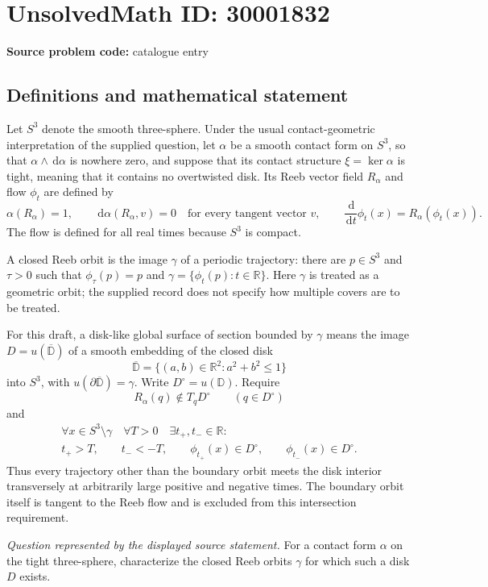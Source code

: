 \documentclass[11pt]{article}
\newcommand{\R}{\mathbb{R}}
\newcommand{\dd}{\,\mathrm{d}}
\begin{document}
\section*{UnsolvedMath ID: 30001832}
\textbf{Source problem code:} catalogue entry
\subsection{Definitions and mathematical statement}
Let \(S^3\) denote the smooth three-sphere. Under the usual contact-geometric interpretation of the supplied question, let \(\alpha\) be a smooth contact form on \(S^3\), so that \(\alpha\wedge\dd\alpha\) is nowhere zero, and suppose that its contact structure \(\xi=\ker\alpha\) is tight, meaning that it contains no overtwisted disk. Its Reeb vector field \(R_\alpha\) and flow \(\phi_t\) are defined by
\[
\alpha(R_\alpha)=1,\qquad \dd\alpha(R_\alpha,v)=0\quad\text{for every tangent vector }v,\qquad
\frac{\dd}{\dd t}\phi_t(x)=R_\alpha(\phi_t(x)).
\]
The flow is defined for all real times because \(S^3\) is compact.

A closed Reeb orbit is the image \(\gamma\) of a periodic trajectory: there are \(p\in S^3\) and \(\tau>0\) such that \(\phi_\tau(p)=p\) and \(\gamma=\{\phi_t(p):t\in\R\}\). Here \(\gamma\) is treated as a geometric orbit; the supplied record does not specify how multiple covers are to be treated.

For this draft, a disk-like global surface of section bounded by \(\gamma\) means the image \(D=u(\overline{\mathbb D})\) of a smooth embedding of the closed disk
\[
\overline{\mathbb D}=\{(a,b)\in\R^2:a^2+b^2\leq 1\}
\]
into \(S^3\), with \(u(\partial\overline{\mathbb D})=\gamma\). Write \(D^\circ=u(\mathbb D)\). Require
\[
R_\alpha(q)\notin T_qD^\circ\qquad(q\in D^\circ)
\]
and
\[
\begin{gathered}
\forall x\in S^3\setminus\gamma\quad\forall T>0\quad
\exists t_+,t_-\in\R:\\
t_+>T,\qquad t_-<-T,\qquad
\phi_{t_+}(x)\in D^\circ,\qquad \phi_{t_-}(x)\in D^\circ.
\end{gathered}
\]
Thus every trajectory other than the boundary orbit meets the disk interior transversely at arbitrarily large positive and negative times. The boundary orbit itself is tangent to the Reeb flow and is excluded from this intersection requirement.

\emph{Question represented by the displayed source statement.} For a contact form \(\alpha\) on the tight three-sphere, characterize the closed Reeb orbits \(\gamma\) for which such a disk \(D\) exists.
\end{document}
